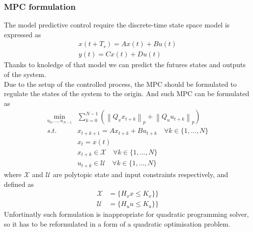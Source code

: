 \subsubsection{MPC formulation}
The model predictive control require the discrete-time state space model is expressed as
\begin{subequations}
	\begin{align}	
	x(t+T_s) = Ax(t) + Bu(t)\\
	y(t) = Cx(t) + Du(t)
	\end{align}
\end{subequations}
Thanks to knoledge of that model we can predict the futures states and outputs of the system.\\
Due to the setup of the controlled process, the MPC should be formulated to regulate the states of the system to the origin. And such MPC can be formulated as
\begin{subequations}
	\begin{align}
		\min_{u_0,...,u_{N-1}} &\sum_{k=0}^{N-1} (\left\| Q_xx_{t+k}\right\|_p+\left\|Q_uu_{t+k}\right\|_p)\\
	    \label{eq217b}s.t.\quad&x_{t+k+1} = Ax_{t+k} + Bu_{t+k}\quad \forall k \in \{1,...,N\}\\
		&x_t = x(t)\\
		\label{cst_x}&x_{t+k}\in\mathcal{X}\quad \forall k \in \{1,...,N\}\\
		\label{cst_u}&u_{t+k}\in\mathcal{U}\quad \forall k \in \{1,...,N\}
	\end{align}
\end{subequations}
where $\mathcal{X}$ and $\mathcal{U}$ are polytopic state and input constraints respectively, and defined as
\begin{subequations}
	\begin{align}
	\mathcal{X} &= \{H_xx\leq K_x\}\}\\
	\mathcal{U} &= \{H_uu\leq K_u\}\}
	\end{align}
\end{subequations}
Unfortinatly such formulation is inappropriate for quadratic programming solver, so it has to be reformulated in a form of a quadratic optimisation problem.
